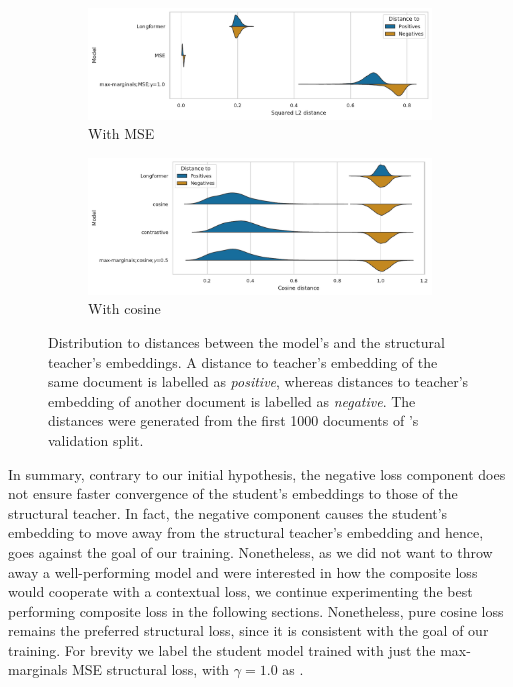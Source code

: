 \begin{figure}
  \centering
  \begin{subfigure}{\textwidth}
    \includegraphics[width=\textwidth]{img/composite_mse_distances.pdf}
    \caption{With MSE}

    \label{fig:composite_mse_distances}

  \end{subfigure}
  \begin{subfigure}{\textwidth}

    \includegraphics[width=\textwidth]{img/composite_cos_distances.pdf}
    \caption{With cosine}

    \label{fig:composite_cos_distances}
  \end{subfigure}

  \caption{Distribution to distances between the model's and the structural
  teacher's embeddings. A distance to teacher's embedding of the same document
  is labelled as \emph{positive}, whereas distances to teacher's embedding of
  another document is labelled as \emph{negative}. The distances were generated
  from the first 1000 documents of 's validation split.}

  \label{fig:composite_distances}

\end{figure}

In summary, contrary to our initial hypothesis, the negative loss component
does not ensure faster convergence of the student's embeddings to those of the
structural teacher. In fact, the negative component causes the student's
embedding to move away from the structural teacher's embedding and hence, goes
against the goal of our training. Nonetheless, as we did not want to throw away
a well-performing model and were interested in how the composite loss would
cooperate with a contextual loss, we continue experimenting the best performing
composite loss in the following sections. Nonetheless, pure cosine loss remains
the preferred structural loss, since it is consistent with the goal of our
training. For brevity we label the student model trained with just the
max-marginals MSE structural loss, with $\gamma=1.0$ as
.

